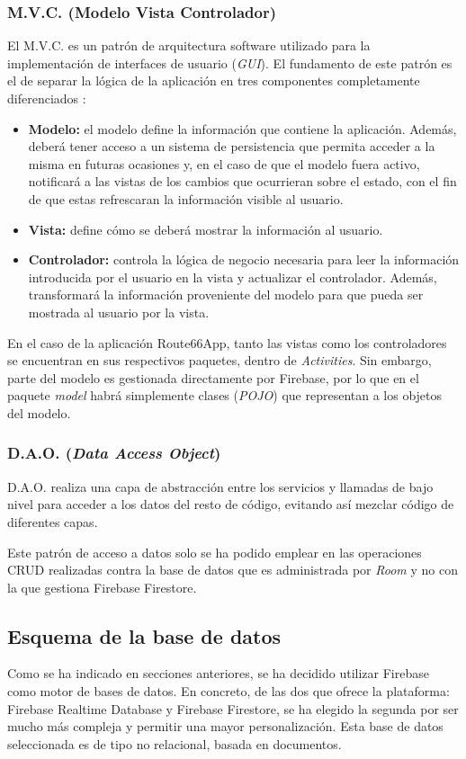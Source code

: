 \documentclass[twoside]{report}
\begin{document}
\subsubsection{M.V.C. (Modelo Vista Controlador)}
El M.V.C. es un patrón de arquitectura software utilizado para la implementación de interfaces de usuario (\textit{GUI}). El fundamento de este patrón es el de separar la lógica de la aplicación en tres componentes completamente diferenciados \cite{mvcua}:
\begin{itemize}
\item \textbf{Modelo:} el modelo define la información que contiene la aplicación. Además, deberá tener acceso a un sistema de persistencia que permita acceder a la misma en futuras ocasiones y, en el caso de que el modelo fuera activo, notificará a las vistas de los cambios que ocurrieran sobre el estado, con el fin de que estas refrescaran la información visible al usuario.
\item \textbf{Vista:} define cómo se deberá mostrar la información al usuario.

\item \textbf{Controlador:} controla la lógica de negocio necesaria para leer la información introducida por el usuario en la vista y actualizar el controlador. Además, transformará la información proveniente del modelo para que pueda ser mostrada al usuario por la vista.
\end{itemize}
En el caso de la aplicación Route66App, tanto las vistas como los controladores se encuentran en sus respectivos paquetes, dentro de \textit{Activities}. Sin embargo, parte del modelo es gestionada directamente por Firebase, por lo que en el paquete \textit{model} habrá simplemente clases (\textit{POJO}) que representan a los objetos del modelo.

\subsubsection{D.A.O. (\textit{Data Access Object})}

D.A.O. realiza una capa de abstracción entre los servicios y llamadas de bajo nivel para acceder a los datos del resto de código, evitando así mezclar código de diferentes capas.

Este patrón de acceso a datos solo se ha podido emplear en las operaciones CRUD realizadas contra la base de datos que es administrada por \textit{Room} \cite{roompersistence} y no con la que gestiona Firebase Firestore.


\subsection{Esquema de la base de datos}
Como se ha indicado en secciones anteriores, se ha decidido utilizar Firebase como motor de bases de datos. En concreto, de las dos que ofrece la plataforma: Firebase Realtime Database y Firebase Firestore, se ha elegido la segunda por ser mucho más compleja y permitir una mayor personalización. Esta base de datos seleccionada es de tipo no relacional, basada en documentos. \\
\end{document}
